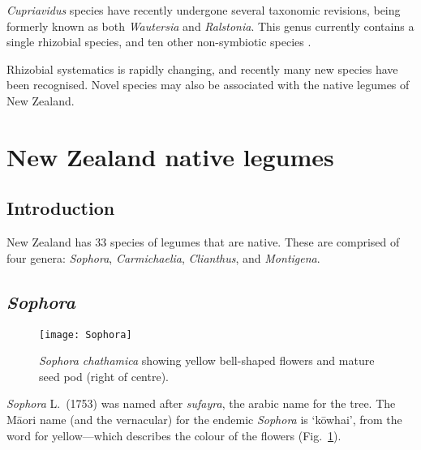 \emph{Cupriavidus} species have recently undergone several taxonomic
revisions, being formerly known as both \emph{Wautersia} and
\emph{Ralstonia}. This genus currently contains a single rhizobial
species, and ten other non-symbiotic species \citep{Euzeby97}.

Rhizobial systematics is rapidly changing, and  recently many new
species have been recognised. Novel species may also be associated
with the native legumes of New Zealand.





\section{New Zealand native legumes} \label{s-NZ-natives}

\subsection{Introduction}

New Zealand has 33 species of legumes that are native. These are
comprised of four genera: \emph{Sophora}, \emph{Carmichaelia},
\emph{Clianthus}, and \emph{Montigena}.



\subsection{\emph{Sophora}}

\begin{figure} [tb]
    \centering
    \texttt{[image: Sophora]}
    \caption[\emph{Sophora chathamica}]{\emph{Sophora chathamica}
     showing yellow bell-shaped flowers and mature seed pod (right of centre).}
    \label{p-Sophora}
\end{figure}

\emph{Sophora} L.~(1753) was named after \emph{sufayra}, the arabic
name for the tree. The M\=aori name (and the vernacular) for the
endemic \emph{Sophora} is `k\=owhai', from the word for
yellow---which describes the colour of the flowers
(Fig.~\ref{p-Sophora}).

